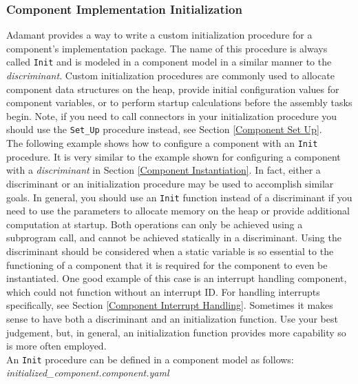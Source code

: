 \subsubsection{Component Implementation Initialization} \label{Component Implementation Initialization}

Adamant provides a way to write a custom initialization procedure for a component's implementation package. The name of this procedure is always called \texttt{Init} and is modeled in a component model in a similar manner to the \textit{discriminant}. Custom initialization procedures are commonly used to allocate component data structures on the heap, provide initial configuration values for component variables, or to perform startup calculations before the assembly tasks begin. Note, if you need to call connectors in your initialization procedure you should use the \texttt{Set\_Up} procedure instead, see Section \ref{Component Set Up}. \\

The following example shows how to configure a component with an \texttt{Init} procedure. It is very similar to the example shown for configuring a component with a \textit{discriminant} in Section \ref{Component Instantiation}. In fact, either a discriminant or an initialization procedure may be used to accomplish similar goals. In general, you should use an \texttt{Init} function instead of a discriminant if you need to use the parameters to allocate memory on the heap or provide additional computation at startup. Both operations can only be achieved using a subprogram call, and cannot be achieved statically in a discriminant. Using the discriminant should be considered when a static variable is so essential to the functioning of a component that it is required for the component to even be instantiated. One good example of this case is an interrupt handling component, which could not function without an interrupt ID. For handling interrupts specifically, see Section \ref{Component Interrupt Handling}. Sometimes it makes sense to have both a discriminant and an initialization function. Use your best judgement, but, in general, an initialization function provides more capability so is more often employed. \\

An \texttt{Init} procedure can be defined in a component model as follows: \\

\textit{initialized\_component.component.yaml}

